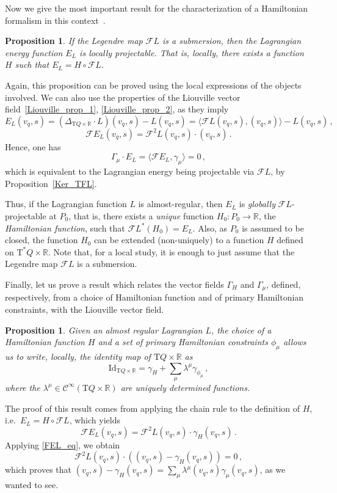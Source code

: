 \documentclass[11pt]{article}
\theoremstyle{plain}
\newtheorem{proposition}[theorem]{Proposition}
\theoremstyle{definition}
\newcommand{\R}{\mathbb{R}}
\newcommand{\Cinfty}{\mathscr{C}^\infty}
\newcommand{\T}{{\mathrm T}}
\let\Tan\T
\newcommand{\Id}{\mathrm{Id}}
\newcommand{\F}{\mathcal{F}}
\def\Tan{\mathrm{T}}
\def\FL{\mathcal{F} L}
\begin{document}
Now we give the most important result for the characterization of a Hamiltonian formalism in this context~\cite{BGPR_86,GN_79}.
\begin{proposition}
	If the Legendre map $\FL$ is a submersion, then the Lagrangian energy function $E_L$ is locally projectable. That is, locally, there exists a function $H$ such that $E_L= H\circ\FL$.
\end{proposition}
Again, this proposition can be proved using the local expressions of the objects involved. We can also use the properties of the Liouville vector field~\eqref{Liouville_prop_1}, \eqref{Liouville_prop_2}, as they imply
\begin{equation}
E_L(v_q,s)=(\Delta_{\Tan Q \times \R}\cdot L)(v_q,s)-L(v_q,s) = \langle  \FL (v_q,s),(v_q,s) \rangle-L(v_q,s)\,, 
\end{equation}
\begin{equation} \label{FEL_eq}
	\F E_L (v_q,s)= \F^2L(v_q,s)\cdot (v_q,s)\,.
\end{equation}
Hence, one has
$$\Gamma_{\mu}\cdot E_L = \langle\F E_L ,\gamma_{\mu}\rangle = 0\,,$$
which is equivalent to the Lagrangian energy being projectable via $\FL$, by Proposition~\ref{Ker_TFL}.

Thus, if the Lagrangian function $L$ is almost-regular, then $E_L$ is \textsl{globally} $\FL$-projectable at $P_0$, that is, there exists a \textsl{unique} function $H_0\colon P_0 \to \R$, the \textsl{Hamiltonian function}, such that $\FL^*(H_0)=E_L$. 
Also, as $P_0$ is assumed to be closed, the function $H_0$ can be extended (non-uniquely) to a function $H$ defined on $\Tan^*Q \times \R$.
Note that, for a local study, it is enough to just assume that the Legendre map $\FL$ is a submersion.

Finally, let us prove a result which relates the vector fields $\Gamma_H$ and $\Gamma_\mu$, defined, respectively, from a choice of Hamiltonian function and of primary Hamiltonian constraints, with the Liouville vector field. 
\begin{proposition}\label{prop_resolution_identity}
    Given an almost regular Lagrangian $L$, the choice of a Hamiltonian function $H$ and a set of primary Hamiltonian constraints $\phi_{\mu}$ allows us to write, locally, the identity map of $\Tan Q \times \R$ as
    \begin{equation} \label{resolution_identity}
        \Id _{\Tan Q \times \R} = \gamma_H +  \sum_{\mu}\lambda^{\mu} \gamma_{\phi_{\mu}}\,,
    \end{equation}
    where the $\lambda^{\mu} \in \Cinfty (\Tan Q\times \R)$ are uniquely determined functions.
\end{proposition}
The proof of this result comes from applying the chain rule to the definition of $H$, i.e.\ $E_L = H\circ \FL$, which yields
$$\F E_L (v_q,s) = \F^2 L (v_q ,s )\cdot\gamma_H(v_q,s)\,. $$
Applying \eqref{FEL_eq}, we obtain
$$\F^2 L (v_q ,s )\cdot((v_q,s)-\gamma_H(v_q,s))=0\,,$$
which proves that $(v_q,s)-\gamma_H(v_q,s) = \sum_{\mu} \lambda^{\mu}(v_q,s)\gamma_\mu(v_q,s)$, as we wanted to see.
\end{document}
